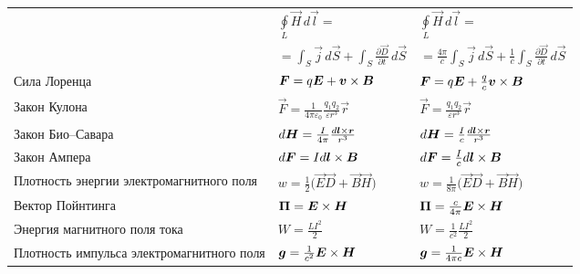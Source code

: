\begin{table}
\begin{tabular}{>{\small}m{30mm} m{35mm} m{35mm}}
&$\oint\limits_{L}\vec{H}\,d\vec{l}=$~~~~~~~~~~&$\oint\limits_{L}\vec{H}\,d\vec{l}=$~~~~~~~~~~\\
&$=\int_{S}\vec{j}\,d\vec{S}+\int_{S}\frac{\partial\vec{D}}{\partial t}\,d\vec{S}$&
$=\frac{4\pi}{c}\int_{S}\vec{j}\,d\vec{S}+\frac{1}{c}\int_{S}\frac{\partial\vec{D}}{\partial t}\,d\vec{S}$\\
Сила Лоренца &${\boldsymbol{F}}=q{\boldsymbol{E}}+{\boldsymbol{v}} \times {\boldsymbol{B}}$&
${\boldsymbol{F}}=q{\boldsymbol{E}}+\frac{q\mathstrut}{c\mathstrut}{\boldsymbol{v}} \times {\boldsymbol{B}}$\\
Закон Кулона &$\vec{F}=\frac{1}{4\pi\varepsilon_0}\frac{q_1q_2}{\varepsilon r^3}\vec{r}$&$\vec{F}=\frac{q_1q_2}{\varepsilon r^3}\vec{r}$\\[2ex]
Закон Био--Савара & $d{\boldsymbol{H}}=\frac{I}{4\pi}\frac{d{\boldsymbol{l}} \times {\boldsymbol{r}}}{r^3}$&
$d{\boldsymbol{H}}=\frac{I}{c}\frac{d{\boldsymbol{l}} \times {\boldsymbol{r}}}{r^3}$\\[2ex]
Закон Ампера &$d{\boldsymbol{F}}=Id{\boldsymbol{l}} \times {\boldsymbol{B}}$&$d{\boldsymbol{F}}=\frac{I}{c}d{\boldsymbol{l}} \times {\boldsymbol{B}}$\\
Плотность энергии электромагнитного поля &$w=\frac12\bigl(\vec{E}\vec{D}+\vec{B}\vec{H}\bigr)$&
$w=\frac{1}{8\pi}\bigl(\vec{E}\vec{D}+\vec{B}\vec{H}\bigr)$\\
Вектор Пойнтинга &${\boldsymbol{\Pi}}={\boldsymbol{E}} \times {\boldsymbol{H}}$&${\boldsymbol{\Pi}}=\frac{c}{4\pi}{\boldsymbol{E}} \times {\boldsymbol{H}}$\\[1ex]
Энергия магнитного поля тока & $W=\frac{LI^2}{2}$&$ W=\frac{1}{c^2}\frac{LI^2}{2}$\\[1ex]
Плотность импульса электромагнитного поля &${\boldsymbol{g}}=\frac{1}{c^2}{\boldsymbol{E}} \times {\boldsymbol{H}}$&
${\boldsymbol{g}}=\frac{1}{4\pi c}{\boldsymbol{E}} \times {\boldsymbol{H}}$\\
\hline
\end{tabular}
\end{table}

\newpage

